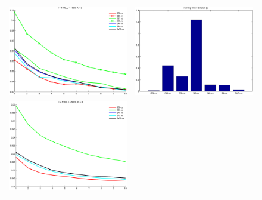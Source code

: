 \documentclass{article}
\begin{document}
\begin{figure}[h!]
\centering
\begin{tabular}{cc}
\includegraphics[scale=0.4]{figs/prec_DS1_I1000_J1000_1.pdf}&
\includegraphics[scale=0.4]{figs/time_DS1_I1000_J1000_1.pdf}\\
\includegraphics[scale=0.4]{figs/prec_DS1_I5000_J5000_1.pdf}&

\end{tabular}
\end{figure}
\end{document}
